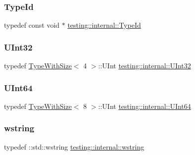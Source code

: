 \subsubsection{\texorpdfstring{TypeId}{TypeId}}
{\footnotesize\ttfamily typedef const void $\ast$ \mbox{\hyperlink{namespacetesting_1_1internal_a38c435cbab5f8b784e2e7f3356cab242}{testing\+::internal\+::\+Type\+Id}}}

\mbox{\label{namespacetesting_1_1internal_a436defbb8e92c8e94e33ebcc86f278ba}} 
\subsubsection{\texorpdfstring{UInt32}{UInt32}}
{\footnotesize\ttfamily typedef \mbox{\hyperlink{classtesting_1_1internal_1_1_type_with_size}{Type\+With\+Size}}$<$ 4 $>$\+::U\+Int \mbox{\hyperlink{namespacetesting_1_1internal_a436defbb8e92c8e94e33ebcc86f278ba}{testing\+::internal\+::\+U\+Int32}}}

\mbox{\label{namespacetesting_1_1internal_ad24ae0a18ae0d3758b9a8333a0b56a4b}} 
\subsubsection{\texorpdfstring{UInt64}{UInt64}}
{\footnotesize\ttfamily typedef \mbox{\hyperlink{classtesting_1_1internal_1_1_type_with_size}{Type\+With\+Size}}$<$ 8 $>$\+::U\+Int \mbox{\hyperlink{namespacetesting_1_1internal_ad24ae0a18ae0d3758b9a8333a0b56a4b}{testing\+::internal\+::\+U\+Int64}}}

\mbox{\label{namespacetesting_1_1internal_a3f543179329c353aee1d7b54a9a8e335}} 
\subsubsection{\texorpdfstring{wstring}{wstring}}
{\footnotesize\ttfamily typedef \+::std\+::wstring \mbox{\hyperlink{namespacetesting_1_1internal_a3f543179329c353aee1d7b54a9a8e335}{testing\+::internal\+::wstring}}}



